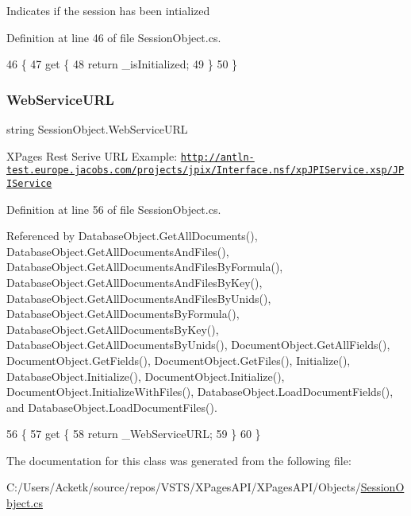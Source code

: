 Indicates if the session has been intialized 



Definition at line 46 of file Session\+Object.\+cs.


\begin{DoxyCode}
46                               \{
47         \textcolor{keyword}{get} \{
48             \textcolor{keywordflow}{return} \_isInitialized;
49         \}
50     \}
\end{DoxyCode}
\mbox{\label{class_session_object_a697c071c812fbf7ad1166b896fb44c16}} 
\subsubsection{\texorpdfstring{Web\+Service\+U\+RL}{WebServiceURL}}
{\footnotesize\ttfamily string Session\+Object.\+Web\+Service\+U\+RL\hspace{0.3cm}{\ttfamily [get]}}



X\+Pages Rest Serive U\+RL Example\+: \href{http://antln-test.europe.jacobs.com/projects/jpix/Interface.nsf/xpJPIService.xsp/JPIService}{\tt http\+://antln-\/test.\+europe.\+jacobs.\+com/projects/jpix/\+Interface.\+nsf/xp\+J\+P\+I\+Service.\+xsp/\+J\+P\+I\+Service} 



Definition at line 56 of file Session\+Object.\+cs.



Referenced by Database\+Object.\+Get\+All\+Documents(), Database\+Object.\+Get\+All\+Documents\+And\+Files(), Database\+Object.\+Get\+All\+Documents\+And\+Files\+By\+Formula(), Database\+Object.\+Get\+All\+Documents\+And\+Files\+By\+Key(), Database\+Object.\+Get\+All\+Documents\+And\+Files\+By\+Unids(), Database\+Object.\+Get\+All\+Documents\+By\+Formula(), Database\+Object.\+Get\+All\+Documents\+By\+Key(), Database\+Object.\+Get\+All\+Documents\+By\+Unids(), Document\+Object.\+Get\+All\+Fields(), Document\+Object.\+Get\+Fields(), Document\+Object.\+Get\+Files(), Initialize(), Database\+Object.\+Initialize(), Document\+Object.\+Initialize(), Document\+Object.\+Initialize\+With\+Files(), Database\+Object.\+Load\+Document\+Fields(), and Database\+Object.\+Load\+Document\+Files().


\begin{DoxyCode}
56                                 \{
57         \textcolor{keyword}{get} \{
58             \textcolor{keywordflow}{return} \_WebServiceURL;
59         \}
60     \}
\end{DoxyCode}


The documentation for this class was generated from the following file\+:\begin{DoxyCompactItemize}
\item 
C\+:/\+Users/\+Acketk/source/repos/\+V\+S\+T\+S/\+X\+Pages\+A\+P\+I/\+X\+Pages\+A\+P\+I/\+Objects/\mbox{\hyperlink{_session_object_8cs}{Session\+Object.\+cs}}\end{DoxyCompactItemize}
